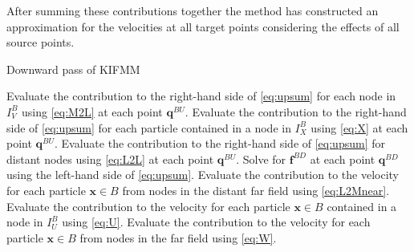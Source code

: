 After summing these contributions together the method has constructed an approximation for the velocities at all target points considering the effects of all source points.


\begin{algorithm}
\caption{Downward pass of KIFMM}\label{alg:DownKIFMM}
\begin{algorithmic}
\State Evaluate the contribution to the right-hand side of \cref{eq:upsum} for each node in $I_V^B$ 
\State \quad using \cref{eq:M2L} at each point $\bm{q}^{BU}$.
\State Evaluate the contribution to the right-hand side of \cref{eq:upsum} for each particle 
\State \quad contained in a node in $I_X^B$ using \cref{eq:X} at each point $\bm{q}^{BU}$.
\State Evaluate the contribution to the right-hand side of \cref{eq:upsum} for distant nodes 
\State \quad using \cref{eq:L2L} at each point $\bm{q}^{BU}$.
\State Solve for $\bm{f}^{BD}$ at each point $\bm{q}^{BD}$ using the left-hand side of \cref{eq:upsum}.
\EndFor
{}
\State Evaluate the contribution to the velocity for each particle $\bm{x}\in B$ from nodes in  
\State \quad the distant far field using \cref{eq:L2Mnear}.
\State Evaluate the contribution to the velocity for each particle $\bm{x}\in B$ contained in a 
\State \quad node in $I_U^B$ using \cref{eq:U}.
\State Evaluate the contribution to the velocity for each particle $\bm{x}\in B$  from nodes in  
\State \quad the far field using \cref{eq:W}.
\EndFor
\end{algorithmic}
\end{algorithm}

